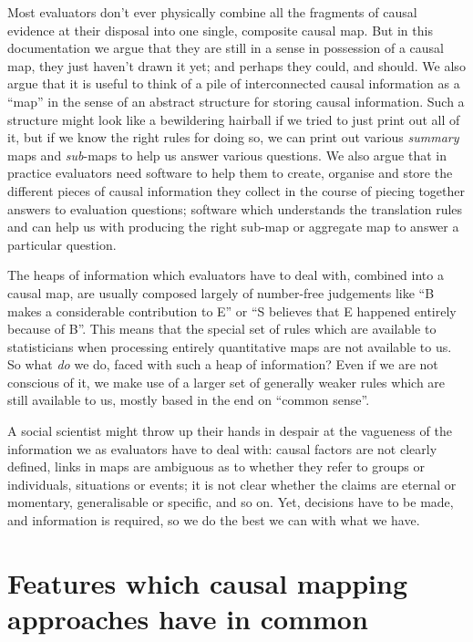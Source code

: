 \documentclass[
]{book}
\begin{document}
Most evaluators don't ever physically combine all the fragments of causal evidence at their disposal into one single, composite causal map. But in this documentation we argue that they are still in a sense in possession of a causal map, they just haven't drawn it yet; and perhaps they could, and should. We also argue that it is useful to think of a pile of interconnected causal information as a ``map'' in the sense of an abstract structure for storing causal information. Such a structure might look like a bewildering hairball if we tried to just print out all of it, but if we know the right rules for doing so, we can print out various \emph{summary} maps and \emph{sub}-maps to help us answer various questions. We also argue that in practice evaluators need software to help them to create, organise and store the different pieces of causal information they collect in the course of piecing together answers to evaluation questions; software which understands the translation rules and can help us with producing the right sub-map or aggregate map to answer a particular question.

The heaps of information which evaluators have to deal with, combined into a causal map, are usually composed largely of number-free judgements like ``B makes a considerable contribution to E'' or ``S believes that E happened entirely because of B''. This means that the special set of rules which are available to statisticians when processing entirely quantitative maps are not available to us. So what \emph{do} we do, faced with such a heap of information? Even if we are not conscious of it, we make use of a larger set of generally weaker rules which are still available to us, mostly based in the end on ``common sense''.

A social scientist might throw up their hands in despair at the vagueness of the information we as evaluators have to deal with: causal factors are not clearly defined, links in maps are ambiguous as to whether they refer to groups or individuals, situations or events; it is not clear whether the claims are eternal or momentary, generalisable or specific, and so on. Yet, decisions have to be made, and information is required, so we do the best we can with what we have.

\hypertarget{features-which-causal-mapping-approaches-have-in-common}{%
\section{Features which causal mapping approaches have in common}\label{features-which-causal-mapping-approaches-have-in-common}}
\end{document}

